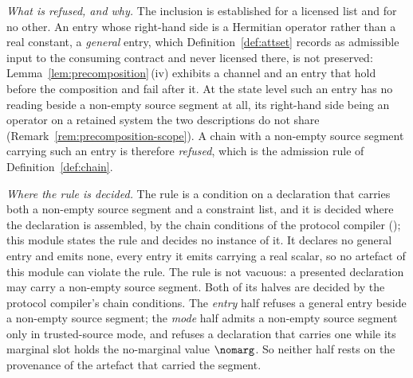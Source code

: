 \begin{remark}
\emph{What is refused, and why.} The inclusion is established for a licensed
list and for no other. An entry whose right-hand side is a Hermitian operator
rather than a real constant, a \emph{general} entry, which
Definition~\ref{def:attset} records as admissible input to the consuming
contract and never licensed there, is not preserved:
Lemma~\ref{lem:precomposition}\,(iv) exhibits a channel and an entry that hold
before the composition and fail after it. At the state level such an entry
has no reading beside a non-empty source segment at all, its right-hand side
being an operator on a retained system the two descriptions do not share
(Remark~\ref{rem:precomposition-scope}). A chain with a non-empty source
segment carrying such an entry is therefore \emph{refused}, which is the
admission rule of Definition~\ref{def:chain}.

\emph{Where the rule is decided.} The rule is a condition on a declaration
that carries both a non-empty source segment and a constraint list, and it is
decided where the declaration is assembled, by the chain conditions of the
protocol compiler (); this module states
the rule and decides no instance of it. It declares no general entry and
emits none, every entry it emits carrying a real scalar, so no artefact of
this module can violate the rule. The rule is not vacuous: a presented
declaration may carry a non-empty source segment. Both of its halves are
decided by the protocol compiler's chain conditions. The \emph{entry} half
refuses a general entry beside a non-empty source segment; the \emph{mode} half admits a non-empty source
segment only in trusted-source mode, and refuses a declaration that carries
one while its marginal slot holds the no-marginal value $\nomarg$. So neither
half rests on the provenance of the artefact that carried the segment.
\end{remark}

